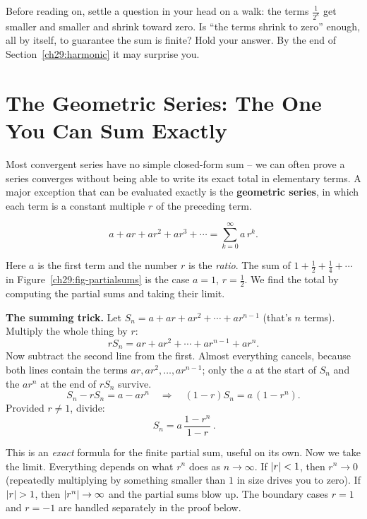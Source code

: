 \begin{walkbox}
Before reading on, settle a question in your head on a walk: the terms $\tfrac{1}{2^k}$ get smaller and smaller and shrink toward zero. Is ``the terms shrink to zero'' enough, all by itself, to guarantee the sum is finite? Hold your answer. By the end of Section~\ref{ch29:harmonic} it may surprise you.
\end{walkbox}

\section{The Geometric Series: The One You Can Sum Exactly}
\label{ch29:geometric}

Most convergent series have no simple closed-form sum -- we can often prove a series converges without being able to write its exact total in elementary terms. A major exception that can be evaluated exactly is the \textbf{geometric series}, in which each term is a constant multiple $r$ of the preceding term.

\[
a + ar + ar^2 + ar^3 + \cdots = \sum_{k=0}^{\infty} a\, r^k .
\]

Here $a$ is the first term and the number $r$ is the \emph{ratio}. The sum of $1 + \tfrac12 + \tfrac14 + \cdots$ in Figure~\ref{ch29:fig-partialsums} is the case $a=1$, $r=\tfrac12$. We find the total by computing the partial sums and taking their limit.

\begin{focusbox}
\textbf{The summing trick.} Let $S_n = a + ar + ar^2 + \cdots + ar^{n-1}$ (that's $n$ terms). Multiply the whole thing by $r$:
\[
r S_n = ar + ar^2 + \cdots + ar^{n-1} + ar^{n}.
\]
Now subtract the second line from the first. Almost everything cancels, because both lines contain the terms $ar, ar^2, \dots, ar^{n-1}$; only the $a$ at the start of $S_n$ and the $ar^n$ at the end of $rS_n$ survive.
\[
S_n - rS_n = a - ar^{n} \quad\Longrightarrow\quad (1-r)S_n = a\,(1 - r^{n}).
\]
Provided $r \neq 1$, divide:
\[
\boxed{\,S_n = a\,\frac{1 - r^{n}}{1 - r}\,}.
\]
\end{focusbox}

This is an \emph{exact} formula for the finite partial sum, useful on its own. Now we take the limit. Everything depends on what $r^n$ does as $n \to \infty$. If $\lvert r\rvert < 1$, then $r^n \to 0$ (repeatedly multiplying by something smaller than $1$ in size drives you to zero). If $\lvert r\rvert > 1$, then $\lvert r^n\rvert \to \infty$ and the partial sums blow up. The boundary cases $r = 1$ and $r = -1$ are handled separately in the proof below.

